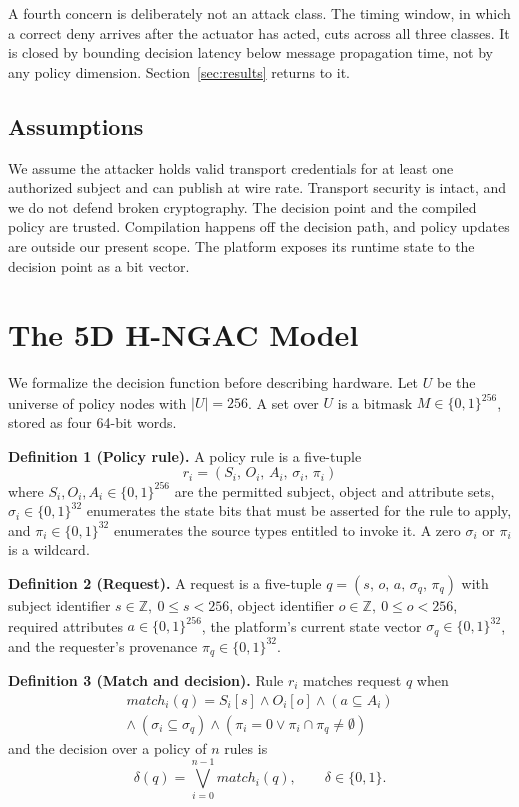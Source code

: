 \documentclass[conference]{IEEEtran}
\begin{document}
A fourth concern is deliberately not an attack class. The timing window, in which a correct deny arrives after the actuator has acted, cuts across all three classes. It is closed by bounding decision latency below message propagation time, not by any policy dimension. Section~\ref{sec:results} returns to it.

\subsection{Assumptions}

We assume the attacker holds valid transport credentials for at least one authorized subject and can publish at wire rate. Transport security is intact, and we do not defend broken cryptography. The decision point and the compiled policy are trusted. Compilation happens off the decision path, and policy updates are outside our present scope. The platform exposes its runtime state to the decision point as a bit vector.

\section{The 5D H-NGAC Model}
\label{sec:model}

We formalize the decision function before describing hardware. Let $U$ be the universe of policy nodes with $|U| = 256$. A set over $U$ is a bitmask $M \in \{0,1\}^{256}$, stored as four 64-bit words.

\textbf{Definition 1 (Policy rule).} A policy rule is a five-tuple
\begin{equation}
r_i = (S_i,\, O_i,\, A_i,\, \sigma_i,\, \pi_i)
\end{equation}
where $S_i, O_i, A_i \in \{0,1\}^{256}$ are the permitted subject, object and attribute sets, $\sigma_i \in \{0,1\}^{32}$ enumerates the state bits that must be asserted for the rule to apply, and $\pi_i \in \{0,1\}^{32}$ enumerates the source types entitled to invoke it. A zero $\sigma_i$ or $\pi_i$ is a wildcard.

\textbf{Definition 2 (Request).} A request is a five-tuple $q = (s,\, o,\, a,\, \sigma_q,\, \pi_q)$ with subject identifier $s \in \mathbb{Z},\ 0 \le s < 256$, object identifier $o \in \mathbb{Z},\ 0 \le o < 256$, required attributes $a \in \{0,1\}^{256}$, the platform's current state vector $\sigma_q \in \{0,1\}^{32}$, and the requester's provenance $\pi_q \in \{0,1\}^{32}$.

\textbf{Definition 3 (Match and decision).} Rule $r_i$ matches request $q$ when
\begin{equation}
\begin{split}
\mathit{match}_i(q) = S_i[s] \wedge O_i[o] \wedge (a \subseteq A_i) \\
\wedge\ (\sigma_i \subseteq \sigma_q) \wedge (\pi_i = 0 \vee \pi_i \cap \pi_q \neq \emptyset)
\end{split}
\end{equation}
and the decision over a policy of $n$ rules is
\begin{equation}
\delta(q) = \bigvee_{i=0}^{n-1} \mathit{match}_i(q), \qquad \delta \in \{0,1\}.
\end{equation}
\end{document}

